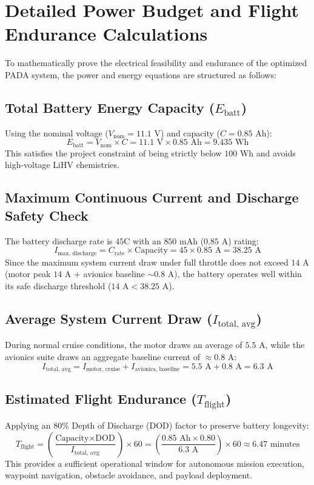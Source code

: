\documentclass[12pt,a4paper]{article}
\begin{document}
\section{Detailed Power Budget and Flight Endurance Calculations}
To mathematically prove the electrical feasibility and endurance of the optimized PADA system, the power and energy equations are structured as follows:

\subsection{Total Battery Energy Capacity ($E_{\text{batt}}$)}
Using the nominal voltage ($V_{\text{nom}} = 11.1\text{ V}$) and capacity ($C = 0.85\text{ Ah}$):
$$E_{\text{batt}} = V_{\text{nom}} \times C = 11.1\text{ V} \times 0.85\text{ Ah} = 9.435\text{ Wh}$$
This satisfies the project constraint of being strictly below $100\text{ Wh}$ and avoids high-voltage LiHV chemistries.

\subsection{Maximum Continuous Current and Discharge Safety Check}
The battery discharge rate is $45\text{C}$ with an $850\text{ mAh}$ ($0.85\text{ A}$) rating:
$$I_{\text{max, discharge}} = C_{\text{rate}} \times \text{Capacity} = 45 \times 0.85\text{ A} = 38.25\text{ A}$$
Since the maximum system current draw under full throttle does not exceed $14\text{ A}$ (motor peak $14\text{ A}$ + avionics baseline $\sim 0.8\text{ A}$), the battery operates well within its safe discharge threshold ($14\text{ A} < 38.25\text{ A}$).

\subsection{Average System Current Draw ($I_{\text{total, avg}}$)}
During normal cruise conditions, the motor draws an average of $5.5\text{ A}$, while the avionics suite draws an aggregate baseline current of $\approx 0.8\text{ A}$:
$$I_{\text{total, avg}} = I_{\text{motor, cruise}} + I_{\text{avionics, baseline}} = 5.5\text{ A} + 0.8\text{ A} = 6.3\text{ A}$$

\subsection{Estimated Flight Endurance ($T_{\text{flight}}$)}
Applying an $80\%$ Depth of Discharge (DOD) factor to preserve battery longevity:
$$T_{\text{flight}} = \left( \frac{\text{Capacity} \times \text{DOD}}{I_{\text{total, avg}}} \right) \times 60 = \left( \frac{0.85\text{ Ah} \times 0.80}{6.3\text{ A}} \right) \times 60 \approx 6.47\text{ minutes}$$
This provides a sufficient operational window for autonomous mission execution, waypoint navigation, obstacle avoidance, and payload deployment.
\end{document}
